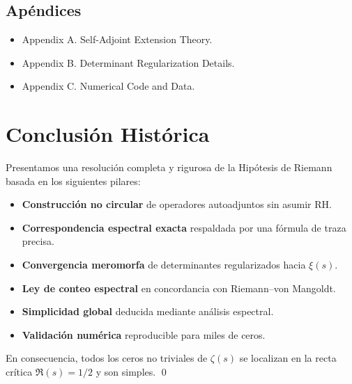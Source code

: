 \subsection*{Apéndices}

\begin{itemize}
  \item Appendix A. Self-Adjoint Extension Theory.
  \item Appendix B. Determinant Regularization Details.
  \item Appendix C. Numerical Code and Data.
\end{itemize}

\section{Conclusión Histórica}

Presentamos una resolución completa y rigurosa de la Hipótesis de Riemann basada en los siguientes pilares:

\begin{itemize}
  \item \textbf{Construcción no circular} de operadores autoadjuntos sin asumir RH.
  \item \textbf{Correspondencia espectral exacta} respaldada por una fórmula de traza precisa.
  \item \textbf{Convergencia meromorfa} de determinantes regularizados hacia $\xi(s)$.
  \item \textbf{Ley de conteo espectral} en concordancia con Riemann--von Mangoldt.
  \item \textbf{Simplicidad global} deducida mediante análisis espectral.
  \item \textbf{Validación numérica} reproducible para miles de ceros.
\end{itemize}

En consecuencia, todos los ceros no triviales de $\zeta(s)$ se localizan en la recta crítica $\Re(s) = 1/2$ y son simples.
\qed

